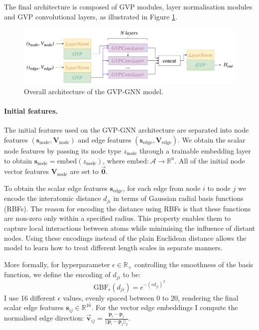 The final architecture is composed of GVP modules, layer normalisation modules and GVP convolutional layers, as illustrated in Figure \ref{gvp-architecture}.
\begin{figure}
    \centering
    \includegraphics[width=\textwidth]{masters-report/figures/gvp-architecture.png}
    \caption{Overall architecture of the GVP-GNN model.}
    \label{gvp-architecture}
\end{figure}

\paragraph{Initial features.} 
The initial features used on the GVP-GNN architecture are separated into node features $(\mathbf{s}_{\text{node}}, \mathbf{V}_{\text{node}})$ and edge features $(\mathbf{s}_{\text{edge}}, \mathbf{V}_{\text{edge}})$. We obtain the scalar node features by passing its node type $z_{\text{node}}$ through a trainable embedding layer to obtain $\mathbf{s}_{\text{node}} = \text{embed}(z_{\text{node}})$, where $\text{embed}:\mathcal{A}\rightarrow \mathbb{R}^n$. All of the initial node vector features $\mathbf{V}_{\text{node}}$ are set to $\vec{\mathbf{0}}$.

To obtain the scalar edge features $\mathbf{s}_{\text{edge}}$, for each edge from node $i$ to node $j$ we encode the interatomic distance $d_{ji}$ in terms of Gaussian radial basis functions (RBFs). The reason for encoding the distance using RBFs is that these functions are non-zero only within a specified radius. This property enables them to capture local interactions between atoms while minimising the influence of distant nodes. Using these encodings instead of the plain Euclidean distance allows the model to learn how to treat different length scales in separate manners.

More formally, for hyperparameter $\epsilon\in\mathbb{R}_{+}$ controlling the smoothness of the basis function, we define the encoding of $d_{ji}$ to be:
\begin{equation}
    \text{GBF}_{\epsilon}(d_{ji}) = e^{-(\epsilon d_{ji})^2}
\end{equation}
I use 16 different $\epsilon$ values, evenly spaced between 0 to 20, rendering the final scalar edge features $\mathbf{s}_{ij} \in \mathbb{R}^{16}$. For the vector edge embeddings I compute the normalised edge direction: $\vec{\mathbf{v}}_{ij} = \frac{\mathbf{p}_i - \mathbf{p}_j}{||\mathbf{p}_i - \mathbf{p}_j||_2}$. 

